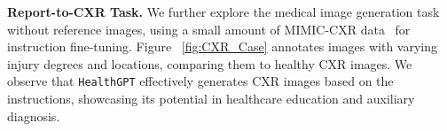 
 

\noindent \textbf{Report-to-CXR Task.} We further explore the medical image generation task without reference images, using a small amount of MIMIC-CXR data~\cite{johnson2019mimic} for instruction fine-tuning. Figure ~\ref{fig:CXR_Case} annotates images with varying injury degrees and locations, comparing them to healthy CXR images. We observe that \texttt{HealthGPT} effectively generates CXR images based on the instructions, showcasing its potential in healthcare education and auxiliary diagnosis.

